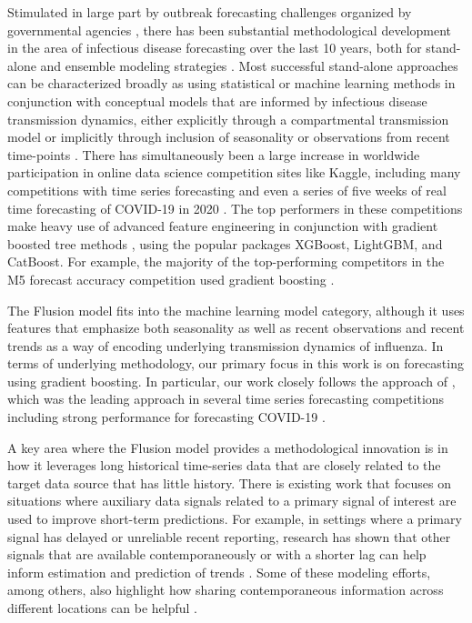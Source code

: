 \documentclass{article}\usepackage[]{graphicx}\usepackage[]{xcolor}
\begin{document}
Stimulated in large part by outbreak forecasting challenges organized by governmental agencies \cite[e.g., ][]{viboud_rapidd_2018,mcgowan_collaborative_2019,johansson_open_2019}, there has been substantial methodological development in the area of infectious disease forecasting over the last 10 years, both for stand-alone and ensemble modeling strategies \cite{yamana_superensemble_2016,reich_accuracy_2019,reis_superensemble_2019,ray_comparing_2023}.
Most successful stand-alone approaches can be characterized broadly as using statistical or machine learning methods in conjunction with conceptual models that are informed by infectious disease transmission dynamics, either explicitly through a compartmental transmission model or implicitly through inclusion of seasonality or observations from recent time-points \cite{reich_collaborative_2019,lopez2024covidCase}.
There has simultaneously been a large increase in worldwide participation in online data science competition sites like Kaggle, including many competitions with time series forecasting and even a series of five weeks of real time forecasting of COVID-19 in 2020 \cite{kaggle2020covidw1, kaggle2020covidw2, kaggle2020covidw3, kaggle2020covidw4, kaggle2020covidw5}.  The top performers in these competitions make heavy use of advanced feature engineering in conjunction with gradient boosted tree methods \cite{friedman2001gbm}, using the popular packages XGBoost, LightGBM, and CatBoost. For example, the majority of the top-performing competitors in the M5 forecast accuracy competition used gradient boosting \cite{makridakis2022m5}.

The Flusion model fits into the machine learning model category, although it uses features that emphasize both seasonality as well as recent observations and recent trends as a way of encoding underlying transmission dynamics of influenza.
In terms of underlying methodology, our primary focus in this work is on forecasting using gradient boosting. In particular, our work closely follows the approach of \cite{lainder2022forecastingGBT}, which was the leading approach in several time series forecasting competitions including strong performance for forecasting COVID-19 \cite{lopez2024covidCase}.

A key area where the Flusion model provides a methodological innovation is in how it leverages long historical time-series data that are closely related to the target data source that has little history.
There is existing work that focuses on situations where auxiliary data signals related to a primary signal of interest are used to improve short-term predictions.
For example, in settings where a primary signal has delayed or unreliable recent reporting, research has shown that other signals that are available contemporaneously or with a shorter lag can help inform estimation and prediction of trends \cite{yang_accurate_2015,farrow_modeling_2016,osthus_even_2019,leuba_tracking_2020,mcdonald_can_2021,jahja_real-time_2022}.
Some of these modeling efforts, among others, also highlight how sharing contemporaneous information across different locations can be helpful \cite{farrow_modeling_2016,mcdonald_can_2021,osthus_multiscale_2021}.
\end{document}
